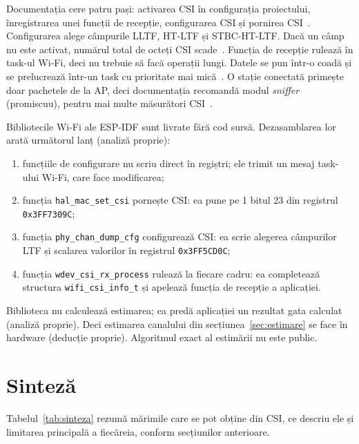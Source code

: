 Documentația cere patru pași: activarea CSI în configurația proiectului, înregistrarea unei funcții de recepție, configurarea CSI și pornirea CSI~\cite{espidf517wifi}.
Configurarea alege câmpurile LLTF, HT-LTF și STBC-HT-LTF.
Dacă un câmp nu este activat, numărul total de octeți CSI scade~\cite{espidf517wifi}.
Funcția de recepție rulează în task-ul Wi-Fi, deci nu trebuie să facă operații lungi.
Datele se pun într-o coadă și se prelucrează într-un task cu prioritate mai mică~\cite{espidf517wifi}.
O stație conectată primește doar pachetele de la AP, deci documentația recomandă modul \emph{sniffer} (promiscuu), pentru mai multe măsurători CSI~\cite{espidf517wifi}.

Bibliotecile Wi-Fi ale ESP-IDF sunt livrate fără cod sursă.
Dezasamblarea lor arată următorul lanț (analiză proprie):
\begin{enumerate}
	\item funcțiile de configurare nu scriu direct în regiștri; ele trimit un mesaj task-ului Wi-Fi, care face modificarea;
	\item funcția \texttt{hal\_\allowbreak{}mac\_\allowbreak{}set\_\allowbreak{}csi} pornește CSI: ea pune pe 1 bitul 23 din registrul \texttt{0x3FF7309C};
	\item funcția \texttt{phy\_\allowbreak{}chan\_\allowbreak{}dump\_\allowbreak{}cfg} configurează CSI: ea scrie alegerea câmpurilor LTF și scalarea valorilor în registrul \texttt{0x3FF5CD0C};
	\item funcția \texttt{wdev\_\allowbreak{}csi\_\allowbreak{}rx\_\allowbreak{}process} rulează la fiecare cadru: ea completează structura \texttt{wifi\_\allowbreak{}csi\_\allowbreak{}info\_\allowbreak{}t} și apelează funcția de recepție a aplicației.
\end{enumerate}
Biblioteca nu calculează estimarea; ea predă aplicației un rezultat gata calculat (analiză proprie).
Deci estimarea canalului din secțiunea~\ref{sec:estimare} se face în hardware (deducție proprie).
Algoritmul exact al estimării nu este public.

\section{Sinteză}\label{sec:sinteza}

Tabelul~\ref{tab:sinteza} rezumă mărimile care se pot obține din CSI, ce descriu ele și limitarea principală a fiecăreia, conform secțiunilor anterioare.

